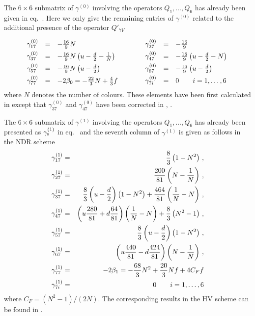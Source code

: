 The $6 \times 6$ submatrix of $\gamma^{(0)}$ involving the
operators $Q_1,\ldots,Q_6$ has already been given in eq.~.
Here we only give the remaining entries of $\gamma^{(0)}$ related to
the additional presence of the operator $Q'_{7V}$
\begin{equation}
\begin{array}{lclclcl}
\gamma^{(0)}_{17} &=& -\frac{16}{9} N
&\qquad&
\gamma^{(0)}_{27} &=& -\frac{16}{9}
\svs \\
\gamma^{(0)}_{37} &=& -\frac{16}{9} N \left(u-\frac{d}{2}-\frac{1}{N} \right)
&\qquad&
\gamma^{(0)}_{47} &=& -\frac{16}{9} \left( u -\frac{d}{2} - N \right)
\svs \\
\gamma^{(0)}_{57} &=& -\frac{16}{9} N \left( u -\frac{d}{2} \right)
&\qquad&
\gamma^{(0)}_{67} &=& -\frac{16}{9} \left( u -\frac{d}{2} \right)
\svs \\
\gamma^{(0)}_{77} &=& -2 \beta_0 = -\frac{22}{3} N + \frac{4}{3} f
&\qquad&
\gamma^{(0)}_{7i} &=& 0 \qquad i=1,\ldots,6
\svs
\end{array}
\label{eq:g0col7kpe}
\end{equation}
where $N$ denotes the number of colours. These elements have been first
calculated in \cite{gilman:80} except that $\gamma^{(0)}_{37}$ and
$\gamma^{(0)}_{47}$ have been corrected in \cite{eegpicek:88},
\cite{flynn:89b}.

The $6 \times 6$ submatrix of $\gamma^{(1)}$ involving the
operators $Q_1,\ldots,Q_6$ has already been presented as $\gamma_{\rm s}^{(1)}$ in
eq.~ and
the seventh column of $\gamma^{(1)}$ is given as follows in the
NDR scheme \cite{burasetal:94a}
\begin{eqnarray}
\gamma^{(1)}_{17} &=& \frac{8}{3} \left( 1 - N^2 \right) \, ,
\nonumber \\
\gamma^{(1)}_{27} &=& \frac{200}{81} \left( N - \frac{1}{N} \right) \, ,
\nonumber \\
\gamma^{(1)}_{37} &=& \frac{8}{3} \left( u - \frac{d}{2} \right) \left( 1
    - N^2 \right) + \frac{464}{81} \left( \frac{1}{N} - N \right) \, ,
\nonumber \\
\gamma^{(1)}_{47} &=& \left( u \frac{280}{81} + d \frac{64}{81} \right)
    \left( \frac{1}{N} - N \right) + \frac{8}{3} \left( N^2 - 1 \right) \, ,
\label{eq:g1col7kpe} \\
\gamma^{(1)}_{57} &=& \frac{8}{3} \left( u - \frac{d}{2} \right)
                      \left( 1 - N^2 \right) \, ,
\nonumber \\
\gamma^{(1)}_{67} &=& \left( u \frac{440}{81} - d \frac{424}{81} \right)
                      \left( N - \frac{1}{N} \right) \, ,
\nonumber \\
\gamma^{(1)}_{77} &=& -2 \beta_1 = -\frac{68}{3} N^2 + \frac{20}{3} N f +
                      4 C_F f
\nonumber \\
\gamma^{(1)}_{7i} &=& 0 \qquad i=1,\ldots,6
\nonumber
\end{eqnarray}
where $C_F = (N^2 -1)/(2 N)$. The corresponding results in the HV
scheme can be found in \cite{burasetal:94a}.

